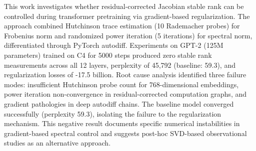 
This work investigates whether residual-corrected Jacobian stable rank can be controlled during transformer pretraining via gradient-based regularization. The approach combined Hutchinson trace estimation (10 Rademacher probes) for Frobenius norm and randomized power iteration (5 iterations) for spectral norm, differentiated through PyTorch autodiff. Experiments on GPT-2 (125M parameters) trained on C4 for 5000 steps produced zero stable rank measurements across all 12 layers, perplexity of 45,792 (baseline: 59.3), and regularization losses of -17.5 billion. Root cause analysis identified three failure modes: insufficient Hutchinson probe count for 768-dimensional embeddings, power iteration non-convergence in residual-corrected computation graphs, and gradient pathologies in deep autodiff chains. The baseline model converged successfully (perplexity 59.3), isolating the failure to the regularization mechanism. This negative result documents specific numerical instabilities in gradient-based spectral control and suggests post-hoc SVD-based observational studies as an alternative approach.
